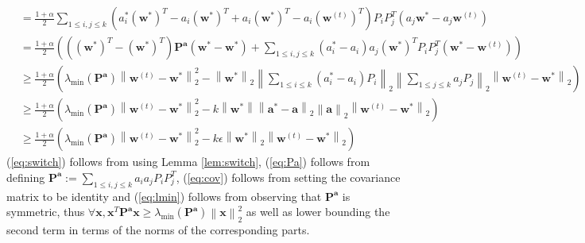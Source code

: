 \documentclass[11pt]{article}
\newcommand{\mat}[1]{\mathbf{#1}}
\newcommand{\vect}[1]{\mathbf{#1}}
\newcommand{\norm}[1]{\left\|#1\right\|}
\begin{document}
\begin{align}
&= \frac{1 + \alpha}{2}\sum_{1 \leq i,j \leq k}\left(a^*_i \left(\vect{w}^*\right)^T - a_i \left(\vect{w}^*\right)^T + a_i \left(\vect{w}^*\right)^T - a_i \left(\vect{w}^{\left(t\right)}\right)^T\right)  P_i P_j^T \left(a_j \vect{w}^* - a_j \vect{w}^{\left(t\right)}\right)\nonumber \\
&= \frac{1 + \alpha}{2}\left(\left(\left(\vect{w}^*\right)^T -\left(\vect{w}^*\right)^T\right) \mat{P}^{\vect{a}} \left(\vect{w}^* -\vect{w}^*\right) + \sum_{1 \leq i,j \leq k}\left(a^*_i - a_i\right)a_j \left(\vect{w}^*\right)^T  P_i P_j^T\left(\vect{w}^* - \vect{w}^{\left(t\right)}\right)\right) \label{eq:Pa}\\
&\geq \frac{1 + \alpha}{2} \left(\lambda_{\min}\left(\mat{P}^{\vect{a}}\right)\norm{\vect{w}^{\left(t\right)} - \vect{w}^*}_2^2 - \norm{\vect{w}^*}_2\norm{\sum_{1 \leq i \leq k}\left(a^*_i - a_i\right)P_i}_2\norm{\sum_{1 \leq j \leq k}a_jP_j}_2 \norm{\vect{w}^{\left(t\right)} - \vect{w}^*}_2\right) \label{eq:lmin}\\
&\geq \frac{1 + \alpha}{2} \left(\lambda_{\min}\left(\mat{P}^{\vect{a}}\right)\norm{\vect{w}^{\left(t\right)} - \vect{w}^*}_2^2 - k\norm{\vect{w}^*}\norm{\vect{a}^* - \vect{a}}_2\norm{\vect{a}}_2 \norm{\vect{w}^{\left(t\right)} - \vect{w}^*}_2\right)\nonumber \\
&\geq \frac{1 + \alpha}{2} \left(\lambda_{\min}\left(\mat{P}^{\vect{a}}\right)\norm{\vect{w}^{\left(t\right)} - \vect{w}^*}_2^2 - k\epsilon \norm{\vect{w}^*}_2\norm{\vect{w}^{\left(t\right)} - \vect{w}^*}_2\right)\nonumber
\end{align}
(\ref{eq:switch}) follows from using Lemma \ref{lem:switch}, (\ref{eq:Pa}) follows from defining $\mat{P}^{\vect{a}}:= \sum_{1 \leq i,j \leq k} a_i a_j P_i P_j^T$, (\ref{eq:cov}) follows from setting the covariance matrix to be identity and (\ref{eq:lmin}) follows from observing that $\mat{P}^{\vect{a}}$ is symmetric, thus $\forall\vect{x}, \vect{x}^T\mat{P}^{\vect{a}}\vect{x} \geq \lambda_{\min}\left(\mat{P}^{\vect{a}}\right)\norm{\vect{x}}_2^2$ as well as lower bounding the second term in terms of the norms of the corresponding parts. 
\end{document}
